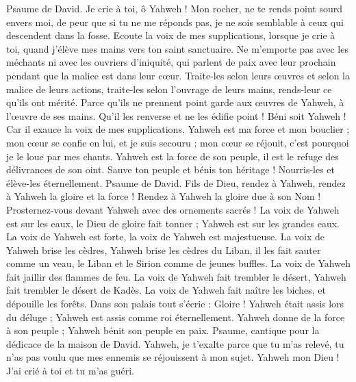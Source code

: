 \begin{multicols}{2}
\VerseOne{}Psaume de David. Je crie à toi, ô Yahweh ! Mon rocher, ne te rends point sourd envers moi, de peur que si tu ne me réponds pas, je ne sois semblable à ceux qui descendent dans la fosse.
Ecoute la voix de mes supplications, lorsque je crie à toi, quand j'élève mes mains vers ton saint sanctuaire.
Ne m'emporte pas avec les méchants ni avec les ouvriers d'iniquité, qui parlent de paix avec leur prochain pendant que la malice est dans leur cœur.
Traite-les selon leurs œuvres et selon la malice de leurs actions, traite-les selon l'ouvrage de leurs mains, rends-leur ce qu'ils ont mérité.
Parce qu'ils ne prennent point garde aux œuvres de Yahweh, à l'œuvre de ses mains. Qu'il les renverse et ne les édifie point !
Béni soit Yahweh ! Car il exauce la voix de mes supplications.
Yahweh est ma force et mon bouclier ; mon cœur se confie en lui, et je suis secouru ; mon cœur se réjouit, c'est pourquoi je le loue par mes chants.
Yahweh est la force de son peuple, il est le refuge des délivrances de son oint.
Sauve ton peuple et bénis ton héritage ! Nourris-les et élève-les éternellement.
\VerseOne{}Psaume de David. Fils de Dieu, rendez à Yahweh, rendez à Yahweh la gloire et la force !
Rendez à Yahweh la gloire due à son Nom ! Prosternez-vous devant Yahweh avec des ornements sacrés !
La voix de Yahweh est sur les eaux, le Dieu de gloire fait tonner ; Yahweh est sur les grandes eaux.
La voix de Yahweh est forte, la voix de Yahweh est majestueuse.
La voix de Yahweh brise les cèdres, Yahweh brise les cèdres du Liban,
il les fait sauter comme un veau, le Liban et le Sirion comme de jeunes buffles.
La voix de Yahweh fait jaillir des flammes de feu.
La voix de Yahweh fait trembler le désert, Yahweh fait trembler le désert de Kadès.
La voix de Yahweh fait naître les biches, et dépouille les forêts. Dans son palais tout s'écrie : Gloire !
Yahweh était assis lors du déluge ; Yahweh est assis comme roi éternellement.
Yahweh donne de la force à son peuple ; Yahweh bénit son peuple en paix.
\VerseOne{}Psaume, cantique pour la dédicace de la maison de David.
Yahweh, je t'exalte parce que tu m'as relevé, tu n'as pas voulu que mes ennemis se réjouissent à mon sujet.
Yahweh mon Dieu ! J'ai crié à toi et tu m'as guéri.

\end{multicols}
